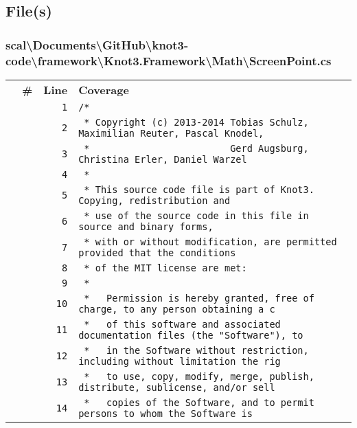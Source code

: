 \documentclass[a4paper,10pt]{article}
\begin{document}
\subsection{File(s)}
\subsubsection{scal\textbackslash Documents\textbackslash GitHub\textbackslash knot3-code\textbackslash framework\textbackslash Knot3.Framework\textbackslash Math\textbackslash ScreenPoint.cs}
\begin{longtable}[l]{lrrl}
\textbf{} & \textbf{\#} & \textbf{Line} & \textbf{Coverage}\\
\cellcolor{gray} &  & \verb~1~ & \verb~/*~\\
\cellcolor{gray} &  & \verb~2~ & \verb~ * Copyright (c) 2013-2014 Tobias Schulz, Maximilian Reuter, Pascal Knodel,~\\
\cellcolor{gray} &  & \verb~3~ & \verb~ *                         Gerd Augsburg, Christina Erler, Daniel Warzel~\\
\cellcolor{gray} &  & \verb~4~ & \verb~ *~\\
\cellcolor{gray} &  & \verb~5~ & \verb~ * This source code file is part of Knot3. Copying, redistribution and~\\
\cellcolor{gray} &  & \verb~6~ & \verb~ * use of the source code in this file in source and binary forms,~\\
\cellcolor{gray} &  & \verb~7~ & \verb~ * with or without modification, are permitted provided that the conditions~\\
\cellcolor{gray} &  & \verb~8~ & \verb~ * of the MIT license are met:~\\
\cellcolor{gray} &  & \verb~9~ & \verb~ *~\\
\cellcolor{gray} &  & \verb~10~ & \verb~ *   Permission is hereby granted, free of charge, to any person obtaining a c~\\
\cellcolor{gray} &  & \verb~11~ & \verb~ *   of this software and associated documentation files (the "Software"), to ~\\
\cellcolor{gray} &  & \verb~12~ & \verb~ *   in the Software without restriction, including without limitation the rig~\\
\cellcolor{gray} &  & \verb~13~ & \verb~ *   to use, copy, modify, merge, publish, distribute, sublicense, and/or sell~\\
\cellcolor{gray} &  & \verb~14~ & \verb~ *   copies of the Software, and to permit persons to whom the Software is~\\

\end{longtable}
\end{document}
